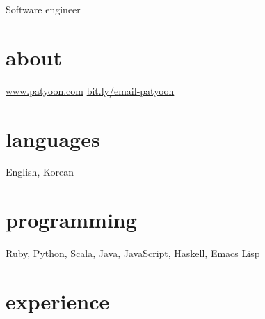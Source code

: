 \documentclass[]{patyoon-cv}
\begin{document}
{Software engineer}

\begin{aside}
  \section{about}
  \href{https://patyoon.com}{www.patyoon.com}
  \href{https://bit.ly/email-patyoon}{bit.ly/email-patyoon}
  \section{languages}
  English, Korean
  \section{programming}
  Ruby,
  Python,
  Scala,
  Java,
  JavaScript,
  Haskell,
  Emacs Lisp
\end{aside}

\section{experience}
\end{document}
